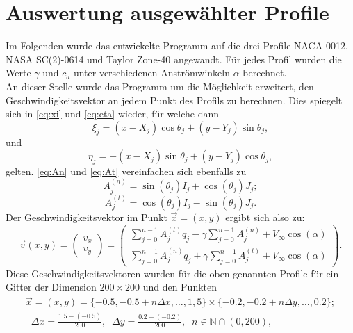 \section{Auswertung ausgewählter Profile}
\label{chap:profilauswertung}
Im Folgenden wurde das entwickelte Programm auf die drei Profile NACA-0012, NASA SC(2)-0614 und Taylor Zone-40 angewandt. Für jedes Profil wurden die Werte $\gamma$ und $c_a$ unter verschiedenen Anströmwinkeln $\alpha $ berechnet. \\
An dieser Stelle wurde das Programm um die Möglichkeit erweitert, den Geschwindigkeitsvektor an jedem Punkt des Profils zu berechnen. Dies spiegelt sich in \eqref{eq:xi} und \eqref{eq:eta} wieder, für welche dann
\begin{equation}
\xi_{j} =  (x - X_j) \cos \theta _j + (y - Y_j) \sin \theta _j,
\end{equation}
und
\begin{equation}
\eta_{j} =  -(x - X_j) \sin \theta _j + (y - Y_j) \cos \theta _j,
\end{equation}
gelten. \eqref{eq:An} und \eqref{eq:At} vereinfachen sich ebenfalls zu
\begin{equation}
A_{j}^{(n)} = \sin {(\theta _j)} I_{j} + \cos{( \theta _j)} J_{j};
\end{equation}
\begin{equation}
A_{j}^{(t)} =  \cos{(\theta _j)} I_{j} - \sin{( \theta _j)} J_{j}.
\end{equation}
Der Geschwindigkeitsvektor im Punkt $\vec x = (x,y)$ ergibt sich also zu:
\begin{equation}
\vec v (x,y) = 
\begin{pmatrix}
v_x \\
v_y
\end{pmatrix}
=
\begin{pmatrix}
\sum_{j=0}^{n-1} A_{j}^{(t)} q_j - \gamma \sum_{j=0}^{n-1}A_{j}^{(n)} + V_{\infty} \cos{(\alpha)} \\
\sum_{j=0}^{n-1} A_{j}^{(n)} q_j + \gamma \sum_{j=0}^{n-1}A_{j}^{(t)} + V_{\infty} \cos{(\alpha)}
\end{pmatrix}.
\end{equation}
Diese Geschwindigkeitsvektoren wurden für die oben genannten Profile für ein Gitter der Dimension $200 \times 200$ und den Punkten
\begin{align*}
\vec x = (x,y) = \{-0.5, -0.5 + n \Delta x,\ldots, 1,5\} \times \{-0.2, -0.2 + n \Delta y, \ldots, 0.2\}; \\ \;\; \Delta x = \frac{1.5 - (-0.5)}{200}, \;\; \Delta y = \frac{0.2 - (-0.2)}{200}, \;\; n \in \mathbb{N} \cap (0,200),
\end{align*} 
